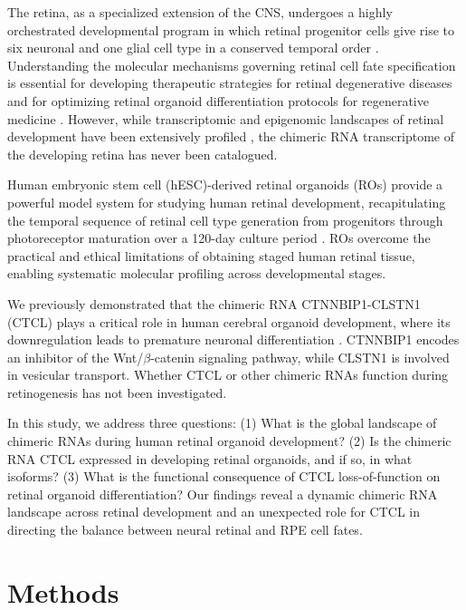 \documentclass[12pt]{article}
\begin{document}
The retina, as a specialized extension of the CNS, undergoes a highly orchestrated developmental program in which retinal progenitor cells give rise to six neuronal and one glial cell type in a conserved temporal order \citep{cepko2014intrinsically,livesey2001vertebrate}. Understanding the molecular mechanisms governing retinal cell fate specification is essential for developing therapeutic strategies for retinal degenerative diseases and for optimizing retinal organoid differentiation protocols for regenerative medicine \citep{eiraku2011self,nakano2012self}. However, while transcriptomic and epigenomic landscapes of retinal development have been extensively profiled \citep{clark2019single,lu2020single}, the chimeric RNA transcriptome of the developing retina has never been catalogued.

Human embryonic stem cell (hESC)-derived retinal organoids (ROs) provide a powerful model system for studying human retinal development, recapitulating the temporal sequence of retinal cell type generation from progenitors through photoreceptor maturation over a 120-day culture period \citep{zhong2014generation,capowski2019reproducibility}. ROs overcome the practical and ethical limitations of obtaining staged human retinal tissue, enabling systematic molecular profiling across developmental stages.

We previously demonstrated that the chimeric RNA CTNNBIP1-CLSTN1 (CTCL) plays a critical role in human cerebral organoid development, where its downregulation leads to premature neuronal differentiation \citep{wu2019chimeric}. CTNNBIP1 encodes an inhibitor of the Wnt/$\beta$-catenin signaling pathway, while CLSTN1 is involved in vesicular transport. Whether CTCL or other chimeric RNAs function during retinogenesis has not been investigated.

In this study, we address three questions: (1) What is the global landscape of chimeric RNAs during human retinal organoid development? (2) Is the chimeric RNA CTCL expressed in developing retinal organoids, and if so, in what isoforms? (3) What is the functional consequence of CTCL loss-of-function on retinal organoid differentiation? Our findings reveal a dynamic chimeric RNA landscape across retinal development and an unexpected role for CTCL in directing the balance between neural retinal and RPE cell fates.

\section{Methods}
\end{document}
